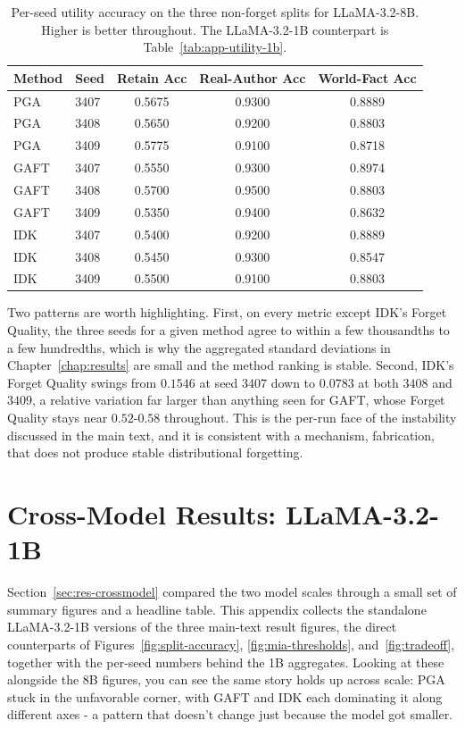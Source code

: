\documentclass[a4paper,12pt]{report}
\begin{document}
\begin{table}[htbp]
	\centering
	\caption{Per-seed utility accuracy on the three non-forget splits for LLaMA-3.2-8B. Higher is better throughout. The LLaMA-3.2-1B counterpart is Table~\ref{tab:app-utility-1b}.}
	\label{tab:app-utility}
	\begin{tabular}{llccc}
		\toprule
		Method & Seed & Retain Acc & Real-Author Acc & World-Fact Acc \\
		\midrule
		PGA  & 3407 & 0.5675 & 0.9300 & 0.8889 \\
		PGA  & 3408 & 0.5650 & 0.9200 & 0.8803 \\
		PGA  & 3409 & 0.5775 & 0.9100 & 0.8718 \\
		\midrule
		GAFT & 3407 & 0.5550 & 0.9300 & 0.8974 \\
		GAFT & 3408 & 0.5700 & 0.9500 & 0.8803 \\
		GAFT & 3409 & 0.5350 & 0.9400 & 0.8632 \\
		\midrule
		IDK  & 3407 & 0.5400 & 0.9200 & 0.8889 \\
		IDK  & 3408 & 0.5450 & 0.9300 & 0.8547 \\
		IDK  & 3409 & 0.5500 & 0.9100 & 0.8803 \\
		\bottomrule
	\end{tabular}
\end{table}

Two patterns are worth highlighting. First, on every metric except IDK's Forget Quality, the three seeds for a given method agree to within a few thousandths to a few hundredths, which is why the aggregated standard deviations in Chapter~\ref{chap:results} are small and the method ranking is stable. Second, IDK's Forget Quality swings from $0.1546$ at seed $3407$ down to $0.0783$ at both $3408$ and $3409$, a relative variation far larger than anything seen for GAFT, whose Forget Quality stays near $0.52$-$0.58$ throughout. This is the per-run face of the instability discussed in the main text, and it is consistent with a mechanism, fabrication, that does not produce stable distributional forgetting.

\chapter{Cross-Model Results: LLaMA-3.2-1B}
\label{app:crossmodel-1b}
Section~\ref{sec:res-crossmodel} compared the two model scales through a small set of summary figures and a headline table. This appendix collects the standalone LLaMA-3.2-1B versions of the three main-text result figures, the direct counterparts of Figures~\ref{fig:split-accuracy}, \ref{fig:mia-thresholds}, and~\ref{fig:tradeoff}, together with the per-seed numbers behind the 1B aggregates. Looking at these alongside the 8B figures, you can see the same story holds up across scale: PGA stuck in the unfavorable corner, with GAFT and IDK each dominating it along different axes - a pattern that doesn't change just because the model got smaller.
\end{document}
